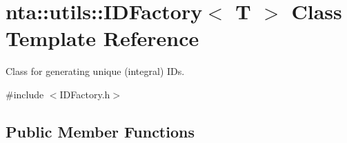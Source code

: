 \hypertarget{classnta_1_1utils_1_1IDFactory}{}\section{nta\+:\+:utils\+:\+:I\+D\+Factory$<$ T $>$ Class Template Reference}
\label{classnta_1_1utils_1_1IDFactory}


Class for generating unique (integral) I\+Ds.  




{\ttfamily \#include $<$I\+D\+Factory.\+h$>$}

\subsection*{Public Member Functions}
